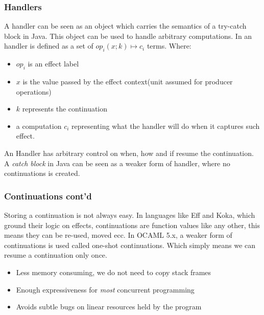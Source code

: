 \documentclass[t]{beamer}
\begin{document}
\begin{frame}
	\frametitle{Handlers}
	
	A handler can be seen as an object which carries the semantics of a try-catch block in Java. This object can be used to \alert{handle} arbitrary computations.
	In \cite{pratner} an handler is defined as a set of $op_i(x; k)\mapsto c_i$ terms. Where:
	\begin{itemize}
		\item $op_i$ is an effect label
		\item $x$ is the value passed by the effect context(unit assumed for producer operations)
		\item $k$ represents the continuation
		\item a computation $c_i$ representing what the handler will do when it captures such effect.
	\end{itemize}
	An Handler has arbitrary control on when, how and if \alert{resume} the continuation. A \textit{catch block} in Java can be seen as a weaker form of handler, where no continuations is created.
\end{frame}


\begin{frame}[fragile]
	\frametitle{Continuations cont'd}	
	Storing a continuation is not \alert{always} easy.
	\newline
	\newline
	In languages like Eff and Koka, which ground their logic on effects, continuations are function values like any other, this means they can be re-used, moved ecc.
	\newline
	\newline
	In OCAML 5.x, a weaker form of continuations is used called \alert{one-shot continuations}. Which simply means we can resume a continuation only once.
	\newline
	\begin{itemize}
		\item Less memory consuming, we do not need to copy stack frames
		\item Enough expressiveness for \textit{most} concurrent programming
		\item Avoids subtle bugs on linear resources held by the program
	\end{itemize}
\end{frame}
\end{document}

